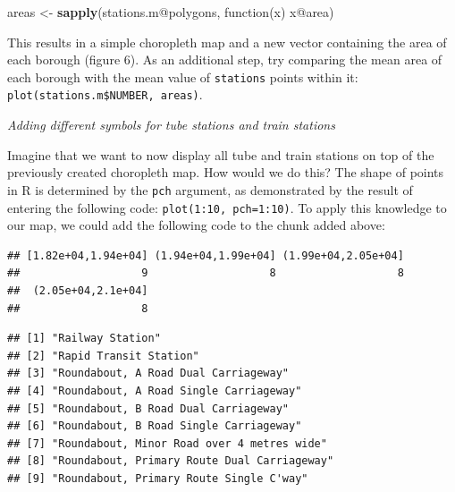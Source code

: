 \documentclass[]{article}
\newenvironment{Shaded}{}{}
\newcommand{\KeywordTok}[1]{\textcolor[rgb]{0.00,0.44,0.13}{\textbf{{#1}}}}
\newcommand{\DataTypeTok}[1]{\textcolor[rgb]{0.56,0.13,0.00}{{#1}}}
\newcommand{\StringTok}[1]{\textcolor[rgb]{0.25,0.44,0.63}{{#1}}}
\newcommand{\NormalTok}[1]{{#1}}
\begin{document}
\begin{Shaded}
\begin{Highlighting}[]
\NormalTok{areas <-}\StringTok{ }\KeywordTok{sapply}\NormalTok{(stations.m@polygons, function(x) x@area)}
\end{Highlighting}
\end{Shaded}

This results in a simple choropleth map and a new vector containing the
area of each borough (figure 6). As an additional step, try comparing
the mean area of each borough with the mean value of \texttt{stations}
points within it: \texttt{plot(stations.m\$NUMBER, areas)}.

\emph{Adding different symbols for tube stations and train stations}

Imagine that we want to now display all tube and train stations on top
of the previously created choropleth map. How would we do this? The
shape of points in R is determined by the \texttt{pch} argument, as
demonstrated by the result of entering the following code:
\texttt{plot(1:10, pch=1:10)}. To apply this knowledge to our map, we
could add the following code to the chunk added above:

\begin{Shaded}
\end{Shaded}

\begin{verbatim}
## [1.82e+04,1.94e+04] (1.94e+04,1.99e+04] (1.99e+04,2.05e+04] 
##                   9                   8                   8 
##  (2.05e+04,2.1e+04] 
##                   8
\end{verbatim}

\begin{verbatim}
## [1] "Railway Station"                           
## [2] "Rapid Transit Station"                     
## [3] "Roundabout, A Road Dual Carriageway"       
## [4] "Roundabout, A Road Single Carriageway"     
## [5] "Roundabout, B Road Dual Carriageway"       
## [6] "Roundabout, B Road Single Carriageway"     
## [7] "Roundabout, Minor Road over 4 metres wide" 
## [8] "Roundabout, Primary Route Dual Carriageway"
## [9] "Roundabout, Primary Route Single C'way"
\end{verbatim}
\end{document}
